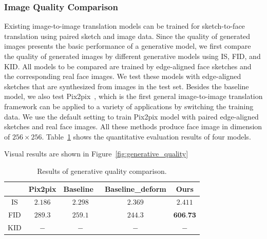 \subsubsection{Image Quality Comparison}
Existing image-to-image translation models can be trained for sketch-to-face translation using paired sketch and image data. 
Since the quality of generated images presents the basic performance of a generative model, we first compare the quality of generated images by different generative models using IS, FID, and KID. 
All models to be compared are trained by edge-aligned face sketches and the corresponding real face images. 
We test these models with edge-aligned sketches that are synthesized from images in the test set. 
Besides the baseline model, we also test Pix2pix~\cite{pix2pix}, which is the first general image-to-image translation framework can be applied to a variety of applications by switching the training data. 
We use the default setting to train Pix2pix model with paired edge-aligned sketches and real face images. 
All these methods produce face image in dimension of $256\times256$.
%
Table~\ref{tab:generative_quality} shows the quantitative evaluation results of four models. 

Visual results are shown in Figure~\ref{fig:generative_quality}


\begin{table}[h]
	\centering	
	\caption{Results of generative quality comparison.}
	\begin{tabular}{|c|c|c|c|c|}\hline
		& Pix2pix \cite{pix2pix} & Baseline~\cite{pix2pixHD} & Baseline\_deform & Ours \\\hline
		IS & $2.186$ & $2.298$ & $2.369$ & $2.411$\\\hline
		FID & $289.3$ & $259.1$ & $244.3$ & $\textbf{606.73}$\\\hline
		KID & $-$ & $-$ & $-$ & $-$\\\hline
	\end{tabular}
	\label{tab:generative_quality}
\end{table} 

